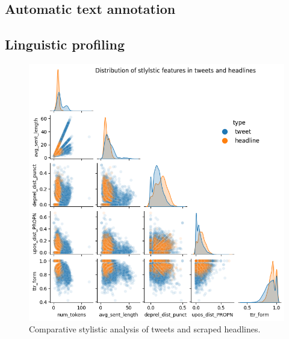 \subsection{Automatic text annotation}
\cite{stanza}
\subsection{Linguistic profiling}
\begin{figure}{}
    \caption{Comparative stylistic analysis of tweets and scraped headlines.}
    \includegraphics[width=\columnwidth]{../../results/images/style.png}
\end{figure}